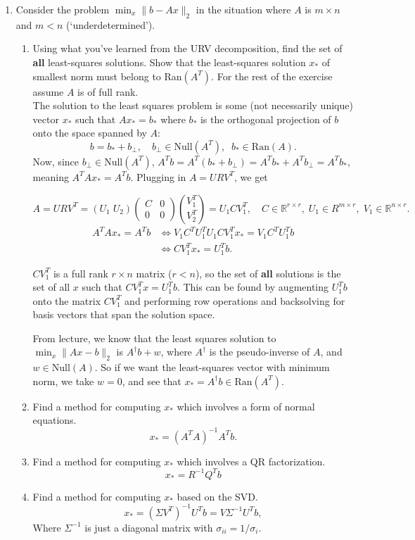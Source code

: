 \documentclass[11pt]{article}
\newcommand{\n}{\vspace{0.3cm}}
\newcommand{\R}{\mathbb{R}}
\begin{document}
\begin{enumerate}
	\item Consider the problem \(\min_x \lVert b - Ax \rVert_2\) in the situation where \(A\) is \(m \times n\) and \(m < n\) (`underdetermined').
	      \begin{enumerate}
		    \item Using what you've learned from the URV decomposition, find the set of \textbf{all} least-squares solutions.  Show that the least-squares solution \(x_*\) of smallest norm must belong to Ran\((A^T)\).  For the rest of the exercise assume \(A\) is of full rank. \n\\
          The solution to the least squares problem is some (not necessarily unique) vector \(x_*\) such that \(Ax_* = b_*\) where \(b_*\) is the orthogonal projection of \(b\) onto the space spanned by \(A\):
          \[b = b_* + b_\perp, \quad b_\perp \in \text{Null}(A^T), \;\; b_* \in \text{Ran}(A).\]
          Now, since \(b_\perp \in \text{Null}(A^T)\), \(A^T b = A^T(b_* + b_\perp) = A^T b_* + A^T b_\perp = A^T b_*\), meaning \(A^T Ax_* = A^T b\).  Plugging in \(A = URV^T\), we get

          \[A = URV^T = (U_1 \; U_2) \begin{pmatrix} C & 0 \\ 0 & 0 \end{pmatrix} \binom{V_1^T}{V_2^T} = U_1 C V_1^T, \quad C \in \R^{r \times r}, \; U_1 \in R^{m \times r}, \; V_1 \in \R^{n \times r}.\]
          \begin{align*}
            A^T Ax_* = A^T b &\iff V_1 C^T U_1^T U_1 C V_1^T x_* = V_1 C^T U_1^T b \\
            &\iff C V_1^T x_* = U_1^T b.
          \end{align*}

          \(CV_1^T\) is a full rank \(r \times n\) matrix (\(r < n\)), so the set of \textbf{all} solutions is the set of all \(x\) such that \(C V_1^T x = U_1^T b\).  This can be found by augmenting \(U_1^T b\) onto the matrix \(C V_1^T\) and performing row operations and backsolving for basis vectors that span the solution space. \n

          From lecture, we know that the least squares solution to \(\min_x \lVert Ax - b \rVert_2\) is \(A^\dag b + w\), where \(A^\dag\) is the pseudo-inverse of \(A\), and \(w \in \text{Null}(A)\).  So if we want the least-squares vector with minimum norm, we take \(w = 0\), and see that \(x_* = A^\dag b \in \text{Ran}(A^T)\). \n
          
		      \item Find a method for computing \(x_*\) which involves a form of normal equations.
            \[x_* = (A^T A)^{-1} A^T b.\]
		      \item Find a method for computing \(x_*\) which involves a QR factorization.
            \[x_* = R^{-1} Q^T b\]
		      \item Find a method for computing \(x_*\) based on the SVD.
            \[x_* = (\Sigma V^T)^{-1} U^T b = V \Sigma^{-1} U^T b,\]
            Where \(\Sigma^{-1}\) is just a diagonal matrix with \(\sigma_{ii} = 1 / \sigma_i\).
	      \end{enumerate}


\end{enumerate}
\end{document}
